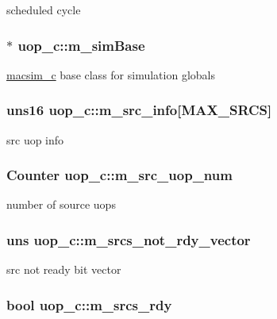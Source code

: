 \label{classuop__c_a0abddd71c924e7ef2c994a68f4a96d2e}
scheduled cycle \hypertarget{classuop__c_a214a67149f1af91c8d3c4ffccc786322}{
\subsubsection[{m\_\-simBase}]{$\ast$ {\bf uop\_\-c::m\_\-simBase}}}
\label{classuop__c_a214a67149f1af91c8d3c4ffccc786322}
\hyperlink{classmacsim__c}{macsim\_\-c} base class for simulation globals \hypertarget{classuop__c_a5511188ca1e9e42c96e926cc43dc997f}{
\subsubsection[{m\_\-src\_\-info}]{\setlength{\rightskip}{0pt plus 5cm}uns16 {\bf uop\_\-c::m\_\-src\_\-info}\mbox{[}MAX\_\-SRCS\mbox{]}}}
\label{classuop__c_a5511188ca1e9e42c96e926cc43dc997f}
src uop info \hypertarget{classuop__c_a18571ad6d71b59f3f400956219270523}{
\subsubsection[{m\_\-src\_\-uop\_\-num}]{\setlength{\rightskip}{0pt plus 5cm}Counter {\bf uop\_\-c::m\_\-src\_\-uop\_\-num}}}
\label{classuop__c_a18571ad6d71b59f3f400956219270523}
number of source uops \hypertarget{classuop__c_af479f3e40620da2d36d3e03bd3c6c54e}{
\subsubsection[{m\_\-srcs\_\-not\_\-rdy\_\-vector}]{\setlength{\rightskip}{0pt plus 5cm}uns {\bf uop\_\-c::m\_\-srcs\_\-not\_\-rdy\_\-vector}}}
\label{classuop__c_af479f3e40620da2d36d3e03bd3c6c54e}
src not ready bit vector \hypertarget{classuop__c_a17902cc0c1b6822c2b2ae90c1dfb68d8}{
\subsubsection[{m\_\-srcs\_\-rdy}]{\setlength{\rightskip}{0pt plus 5cm}bool {\bf uop\_\-c::m\_\-srcs\_\-rdy}}}
